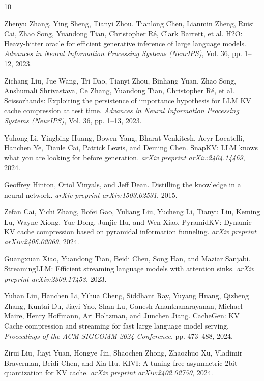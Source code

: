 \documentclass[11pt]{article}
\begin{document}

\begin{thebibliography}{10}

Zhenyu Zhang, Ying Sheng, Tianyi Zhou, Tianlong Chen, Lianmin Zheng, Ruisi Cai, Zhao Song, Yuandong Tian, Christopher Ré, Clark Barrett, et al.
\newblock H2O: Heavy-hitter oracle for efficient generative inference of large language models.
\newblock \textit{Advances in Neural Information Processing Systems (NeurIPS)}, Vol. 36, pp. 1--12, 2023.

Zichang Liu, Jue Wang, Tri Dao, Tianyi Zhou, Binhang Yuan, Zhao Song, Anshumali Shrivastava, Ce Zhang, Yuandong Tian, Christopher Ré, et al.
\newblock Scissorhands: Exploiting the persistence of importance hypothesis for LLM KV cache compression at test time.
\newblock \textit{Advances in Neural Information Processing Systems (NeurIPS)}, Vol. 36, pp. 1--13, 2023.

Yuhong Li, Yingbing Huang, Bowen Yang, Bharat Venkitesh, Acyr Locatelli, Hanchen Ye, Tianle Cai, Patrick Lewis, and Deming Chen.
\newblock SnapKV: LLM knows what you are looking for before generation.
\newblock \textit{arXiv preprint arXiv:2404.14469}, 2024.

Geoffrey Hinton, Oriol Vinyals, and Jeff Dean.
\newblock Distilling the knowledge in a neural network.
\newblock \textit{arXiv preprint arXiv:1503.02531}, 2015.

Zefan Cai, Yichi Zhang, Bofei Gao, Yuliang Liu, Yucheng Li, Tianyu Liu, Keming Lu, Wayne Xiong, Yue Dong, Junjie Hu, and Wen Xiao.
\newblock PyramidKV: Dynamic KV cache compression based on pyramidal information funneling.
\newblock \textit{arXiv preprint arXiv:2406.02069}, 2024.

Guangxuan Xiao, Yuandong Tian, Beidi Chen, Song Han, and Maziar Sanjabi.
\newblock StreamingLLM: Efficient streaming language models with attention sinks.
\newblock \textit{arXiv preprint arXiv:2309.17453}, 2023.

Yuhan Liu, Hanchen Li, Yihua Cheng, Siddhant Ray, Yuyang Huang, Qizheng Zhang, Kuntai Du, Jiayi Yao, Shan Lu, Ganesh Ananthanarayanan, Michael Maire, Henry Hoffmann, Ari Holtzman, and Junchen Jiang.
\newblock CacheGen: KV Cache compression and streaming for fast large language model serving.
\newblock \textit{Proceedings of the ACM SIGCOMM 2024 Conference}, pp. 473--488, 2024.

Zirui Liu, Jiayi Yuan, Hongye Jin, Shaochen Zhong, Zhaozhuo Xu, Vladimir Braverman, Beidi Chen, and Xia Hu.
\newblock KIVI: A tuning-free asymmetric 2bit quantization for KV cache.
\newblock \textit{arXiv preprint arXiv:2402.02750}, 2024.


\end{thebibliography}
\end{document}
